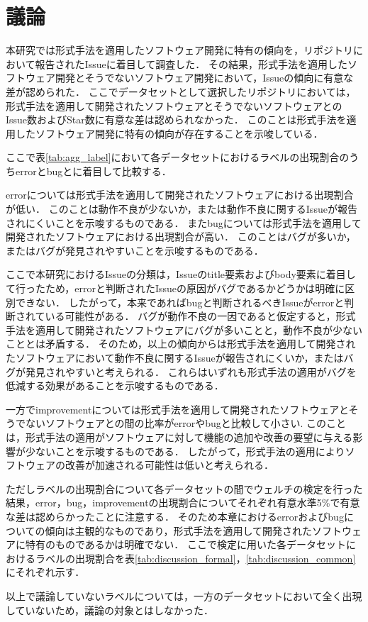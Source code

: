 \documentclass[main]{subfiles}
\begin{document}
\chapter{議論}

本研究では形式手法を適用したソフトウェア開発に特有の傾向を，リポジトリにおいて報告されたIssueに着目して調査した．
その結果，形式手法を適用したソフトウェア開発とそうでないソフトウェア開発において，Issueの傾向に有意な差が認められた．
ここでデータセットとして選択したリポジトリにおいては，形式手法を適用して開発されたソフトウェアとそうでないソフトウェアとのIssue数およびStar数に有意な差は認められなかった．
このことは形式手法を適用したソフトウェア開発に特有の傾向が存在することを示唆している．

ここで表\ref{tab:agg_label}において各データセットにおけるラベルの出現割合のうちerrorとbugとに着目して比較する．

errorについては形式手法を適用して開発されたソフトウェアにおける出現割合が低い．
このことは動作不良が少ないか，または動作不良に関するIssueが報告されにくいことを示唆するものである．
またbugについては形式手法を適用して開発されたソフトウェアにおける出現割合が高い．
このことはバグが多いか，またはバグが発見されやすいことを示唆するものである．

ここで本研究におけるIssueの分類は，Issueのtitle要素およびbody要素に着目して行ったため，errorと判断されたIssueの原因がバグであるかどうかは明確に区別できない．
したがって，本来であればbugと判断されるべきIssueがerrorと判断されている可能性がある．
バグが動作不良の一因であると仮定すると，形式手法を適用して開発されたソフトウェアにバグが多いことと，動作不良が少ないこととは矛盾する．
そのため，以上の傾向からは形式手法を適用して開発されたソフトウェアにおいて動作不良に関するIssueが報告されにくいか，またはバグが発見されやすいと考えられる．
これらはいずれも形式手法の適用がバグを低減する効果があることを示唆するものである．

一方でimprovementについては形式手法を適用して開発されたソフトウェアとそうでないソフトウェアとの間の比率がerrorやbugと比較して小さい.
このことは，形式手法の適用がソフトウェアに対して機能の追加や改善の要望に与える影響が少ないことを示唆するものである．
したがって，形式手法の適用によりソフトウェアの改善が加速される可能性は低いと考えられる．

ただしラベルの出現割合について各データセットの間でウェルチの検定を行った結果，error，bug，improvementの出現割合についてそれぞれ有意水準5\%で有意な差は認めらかったことに注意する．
そのため本章におけるerrorおよびbugについての傾向は主観的なものであり，形式手法を適用して開発されたソフトウェアに特有のものであるかは明確でない．
ここで検定に用いた各データセットにおけるラベルの出現割合を表\ref{tab:discussion_formal}，\ref{tab:discussion_common}にそれぞれ示す．

以上で議論していないラベルについては，一方のデータセットにおいて全く出現していないため，議論の対象とはしなかった．



\end{document}
